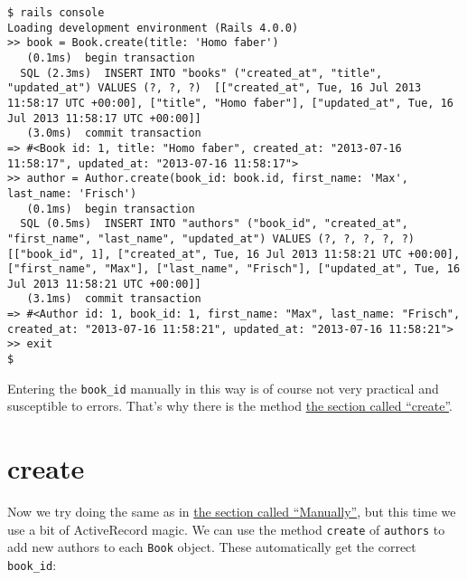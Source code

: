 \documentclass[a4paper]{book}
\begin{document}
\begin{shaded}\begin{verbatim}
$ rails console
Loading development environment (Rails 4.0.0)
>> book = Book.create(title: 'Homo faber')
   (0.1ms)  begin transaction
  SQL (2.3ms)  INSERT INTO "books" ("created_at", "title", "updated_at") VALUES (?, ?, ?)  [["created_at", Tue, 16 Jul 2013 11:58:17 UTC +00:00], ["title", "Homo faber"], ["updated_at", Tue, 16 Jul 2013 11:58:17 UTC +00:00]]
   (3.0ms)  commit transaction
=> #<Book id: 1, title: "Homo faber", created_at: "2013-07-16 11:58:17", updated_at: "2013-07-16 11:58:17">
>> author = Author.create(book_id: book.id, first_name: 'Max', last_name: 'Frisch')
   (0.1ms)  begin transaction
  SQL (0.5ms)  INSERT INTO "authors" ("book_id", "created_at", "first_name", "last_name", "updated_at") VALUES (?, ?, ?, ?, ?)  [["book_id", 1], ["created_at", Tue, 16 Jul 2013 11:58:21 UTC +00:00], ["first_name", "Max"], ["last_name", "Frisch"], ["updated_at", Tue, 16 Jul 2013 11:58:21 UTC +00:00]]
   (3.1ms)  commit transaction
=> #<Author id: 1, book_id: 1, first_name: "Max", last_name: "Frisch", created_at: "2013-07-16 11:58:21", updated_at: "2013-07-16 11:58:21">
>> exit
$
\end{verbatim}\end{shaded}

Entering the \texttt{book\_id} manually in this way is of course not very practical and susceptible to errors. That's why there is the method \hyperref[activerecordux5fhasux5fmanyux5fcreate]{the section called “create”}.

\section{create}\label{create-1}

Now we try doing the same as in \hyperref[activerecordux5fhinzufuegenux5fmanuell]{the section called “Manually”}, but this time we use a bit of ActiveRecord magic. We can use the method \texttt{create} of \texttt{authors} to add new authors to each \texttt{Book} object. These automatically get the correct \texttt{book\_id}:
\end{document}

